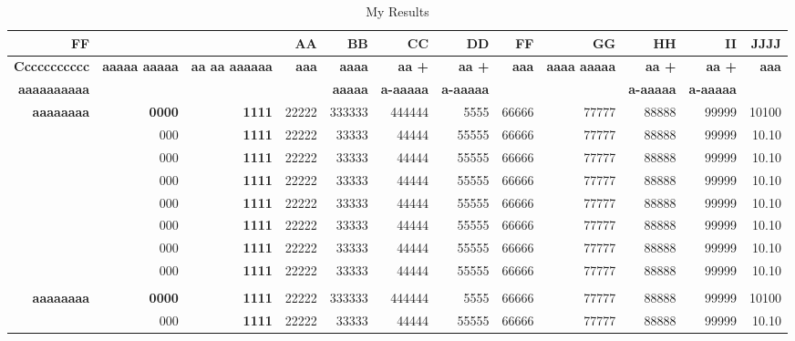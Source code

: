 \documentclass[9pt,twoside]{rmaa-rho-class/rmaa-rho}
\begin{document}
\begin{landscape}
\begin{table}[htbp]
  \centering\small
  \caption{My Results \label{tab:pwlstable}}
    \begin{tabular}{rrrrrrrrrrrr}
    \toprule
    \textbf{FF} & \textbf{} & \textbf{} & \textbf{AA} & \textbf{BB} & \textbf{CC} & \textbf{DD} & \textbf{FF} & \textbf{GG} & \textbf{HH} & \textbf{II} & \textbf{JJJJ} \\
    \midrule
    \textbf{Ccccccccccc} & \multirow{2}[2]{*}{\textbf{aaaaa aaaaa}} & \multirow{2}[2]{*}{\textbf{aa aa aaaaaa}} & \multirow{2}[2]{*}{\textbf{aaa}} & \textbf{aaaa} & \textbf{aa +} & \textbf{aa +} & \multirow{2}[2]{*}{\textbf{aaa}} & \multirow{2}[2]{*}{\textbf{aaaa aaaaa}} & \textbf{aa +} & \textbf{aa +} & \multirow{2}[2]{*}{\textbf{aaa}} \\
    \textbf{aaaaaaaaaa} &       &       &       & \textbf{aaaaa} & \textbf{a-aaaaa} & \textbf{a-aaaaa} &       &       & \textbf{a-aaaaa} & \textbf{a-aaaaa} &  \\
    \midrule
    \textbf{aaaaaaaa} & \textbf{0000} & \textbf{1111} & 22222 & 333333 & 444444 & 5555  & 66666 & 77777 & 88888 & 99999 & 10100 \\
          & 000   & \textbf{1111} & 22222 & 33333 & 44444 & 55555  & 66666 & 77777 & 88888 & 99999 & 10.10 \\
          & 000   & \textbf{1111} & 22222 & 33333 & 44444 & 55555  & 66666 & 77777 & 88888 & 99999 & 10.10 \\
          & 000   & \textbf{1111} & 22222 & 33333 & 44444 & 55555  & 66666 & 77777 & 88888 & 99999 & 10.10 \\
          & 000   & \textbf{1111} & 22222 & 33333 & 44444 & 55555  & 66666 & 77777 & 88888 & 99999 & 10.10 \\
          & 000   & \textbf{1111} & 22222 & 33333 & 44444 & 55555  & 66666 & 77777 & 88888 & 99999 & 10.10 \\
          & 000   & \textbf{1111} & 22222 & 33333 & 44444 & 55555  & 66666 & 77777 & 88888 & 99999 & 10.10 \\
          & 000   & \textbf{1111} & 22222 & 33333 & 44444 & 55555  & 66666 & 77777 & 88888 & 99999 & 10.10 \\\\
    \textbf{aaaaaaaa} & \textbf{0000} & \textbf{1111} & 22222 & 333333 & 444444 & 5555  & 66666 & 77777 & 88888 & 99999 & 10100 \\
          & 000   & \textbf{1111} & 22222 & 33333 & 44444 & 55555  & 66666 & 77777 & 88888 & 99999 & 10.10 \\

\end{tabular}
\end{table}
\end{landscape}
\end{document}
